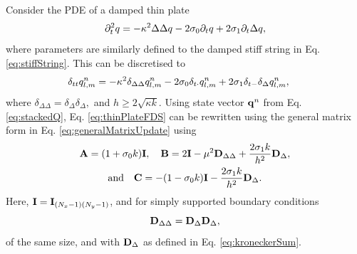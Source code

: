 \documentclass[fleqn]{jaes}
\begin{document}
Consider the PDE of a damped thin plate \cite{Morse1968, Bilbao2009}
\begin{equation}\label{eq:thinPlatePDE}
    \ptt q = -\kappa^2\Delta\Delta q -2\sigma_0\pt q +2\sigma_1\pt\Delta q,
\end{equation}
where parameters are similarly defined to the damped stiff string in Eq. \eqref{eq:stiffString}. This can be discretised to 
\begin{equation}\label{eq:thinPlateFDS}
    \!\!\!\!\!\!\!\!\dtt\qlmn = -\kappa^2\delta_{\Delta\Delta}\qlmn-2\sigma_0\dtd \qlmn +2\sigma_1\dtm\dDelta \qlmn,
\end{equation}
where $\delta_{\Delta\Delta} = \delta_{\Delta}\delta_{\Delta},$ and $h \geq 2\sqrt{\kappa k}$. 
Using state vector $\mathbf{q}^n$ from Eq. \eqref{eq:stackedQ}, Eq. \eqref{eq:thinPlateFDS} can be rewritten using the general matrix form in Eq. \eqref{eq:generalMatrixUpdate} using
\begin{equation}\label{eq:thinPlateMats}
\begin{gathered}
    \A = (1+\sigma_0k)\I, \quad \B = 2\I - \mu^2 \DDeltaDelta + \frac{2\sigma_1k}{h^2}\DDeltamat,\\
    \text{and} \quad\C = -(1-\sigma_0k)\I - \frac{2\sigma_1k}{h^2}\DDeltamat.
    \end{gathered}
\end{equation}
Here, $\mathbf{I} = \mathbf{I}_{(N_x-1)(N_y-1)}$, and for simply supported boundary conditions
\begin{equation}\label{eq:DDeltaDelta}
    \DDeltaDelta = \DDeltamat\DDeltamat,
\end{equation}
of the same size, and with $\mathbf{D}_\Delta$ as defined in Eq. \eqref{eq:kroneckerSum}.
\end{document}
